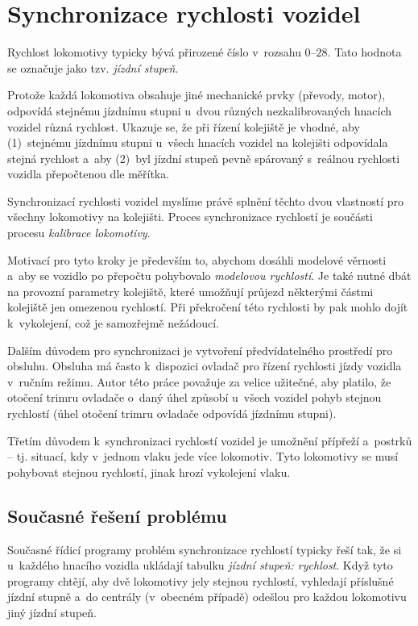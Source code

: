 \section{Synchronizace rychlosti vozidel}
\label{sec:sync-rych}

Rychlost lokomotivy typicky bývá přirozené číslo v~rozsahu $0$--$28$. Tato
hodnota se označuje jako tzv. \textit{jízdní stupeň}.

Protože každá lokomotiva obsahuje jiné mechanické prvky (převody, motor),
odpovídá stejnému jízdnímu stupni u~dvou různých nezkalibrovaných hnacích
vozidel různá rychlost. Ukazuje se, že při řízení kolejiště je vhodné, aby
(1)~stejnému jízdnímu stupni u~všech hnacích vozidel na kolejišti odpovídala
stejná rychlost a~aby (2)~byl jízdní stupeň pevně spárovaný s~reálnou rychlosti
vozidla přepočtenou dle měřítka.

Synchronizací rychlosti vozidel myslíme právě splnění těchto dvou vlastností
pro všechny lokomotivy na kolejišti. Proces synchronizace rychlostí je součásti
procesu \textit{kalibrace lokomotivy}.

Motivací pro tyto kroky je především to, abychom dosáhli modelové věrnosti
a~aby se vozidlo po přepočtu pohybovalo \textit{modelovou rychlostí}. Je také
nutné dbát na provozní parametry kolejiště, které umožňují průjezd některými
částmi kolejiště jen omezenou rychlostí. Při překročení této rychlosti by pak
mohlo dojít k~vykolejení, což je samozřejmě nežádoucí.

Dalším důvodem pro synchronizaci je vytvoření předvídatelného prostředí pro
obsluhu. Obsluha má často k~dispozici ovladač pro řízení rychlosti jízdy
vozidla v~ručním režimu. Autor této práce považuje za velice užitečné, aby
platilo, že otočení trimru ovladače o~daný úhel způsobí u~všech vozidel pohyb
stejnou rychlostí (úhel otočení trimru ovladače odpovídá jízdnímu stupni).

Třetím důvodem k~synchronizaci rychlostí vozidel je umožnění přípřeží a~postrků
-- tj.  situací, kdy v~jednom vlaku jede více lokomotiv. Tyto lokomotivy se
musí pohybovat stejnou rychlostí, jinak hrozí vykolejení vlaku.

\subsection{Současné řešení problému}

Současné řídicí programy problém synchronizace rychlostí typicky řeší tak, že
si u~každého hnacího vozidla ukládají tabulku \textit{jízdní stupeň: rychlost}.
Když tyto programy chtějí, aby dvě lokomotivy jely stejnou rychlostí, vyhledají
příslušné jízdní stupně a~do centrály (v~obecném případě) odešlou pro každou
lokomotivu jiný jízdní stupeň.

